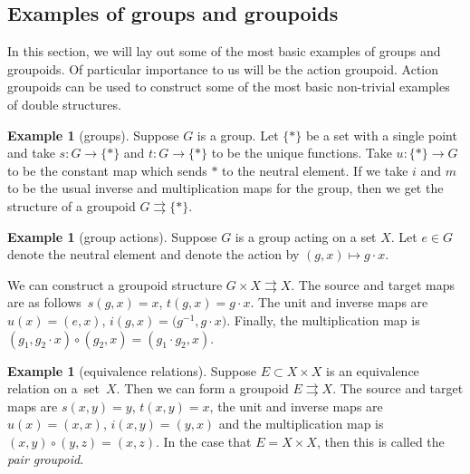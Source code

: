 \documentclass[pdftex]{sigma}
\numberwithin{equation}{section}
\theoremstyle{definition}
\newtheorem{Example}[Theorem]{Example}
\newcommand{\inv}{^{-1}}
\newcommand{\grpd}{\rightrightarrows}
\begin{document}
\subsection{Examples of groups and groupoids}
In this section, we will lay out some of the most basic examples of groups and groupoids. Of particular importance to us will be the action groupoid. Action groupoids can be used to construct some of the most basic non-trivial examples of double structures.
\begin{Example}[groups]
  Suppose $ G $ is a group.
  Let $ \{ * \} $ be a set with a single point and take $ s \colon G \to \{ * \} $ and $ t \colon G \to \{ * \} $ to be the unique functions.
  Take $ u \colon \{ * \} \to G$ to be the constant map which sends $ * $ to the neutral element.
  If we take $ i $ and $ m$ to be the usual inverse and multiplication maps for the group, then we get the structure of a groupoid $ G \grpd \{ * \} $.
\end{Example}
\begin{Example}[group actions]
Suppose $ G $ is a group acting on a set $ X $.
Let $ e \in G $ denote the neutral element and denote the action by $ (g,x) \mapsto g \cdot x $.

We can construct a groupoid structure $G \times X \grpd X $.
The source and target maps are as follows~${s(g,x) = x}$, $t(g,x) = g \cdot x$.
The unit and inverse maps are $u(x) = (e,x)$, ${i(g,x) = \big(g\inv, g \cdot x \big)}$.
Finally, the multiplication map is $(g_1, g_2 \cdot x) \circ (g_2, x) = (g_1 \cdot g_2, x )$.
\end{Example}

\begin{Example}[equivalence relations]
  Suppose $ E \subset X \times X $ is an equivalence relation on a~set~$ X$.
  Then we can form a groupoid $ E \grpd X $.
   The source and target maps are $s(x,y) = y$, $t(x,y) = x$, the unit and inverse maps are $u(x) = (x,x)$, $i(x,y) = (y,x)$ and the multiplication map is~${(x,y) \circ (y,z) = (x,z)}$. In the case that $ E = X \times X $, then this is called the \emph{pair groupoid}.
\end{Example}
\end{document}

